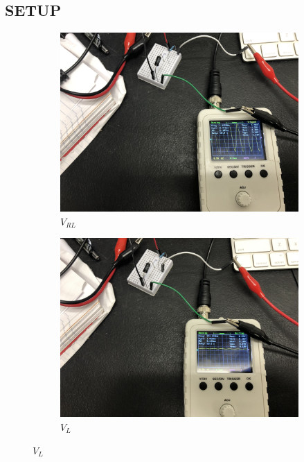 \documentclass{article}
\def\F#1{\(#1\)}
\begin{document}
\begin{center}
  \subsection*{SETUP}
  \begin{figure}[!htp]
    \begin{subfigure}{0.5\textwidth}
    \includegraphics[scale=0.066]{V_RL.jpeg}
    \caption*{\F{V_{RL}}}\label{fig:subim1}
    \end{subfigure}
    \begin{subfigure}{0.5\textwidth}
    \includegraphics[scale=0.066]{V_L.jpeg}
    \caption*{\F{V_{L}}}\label{fig:subim2}
    \end{subfigure}
  \end{figure}

\end{center}
\end{document}
